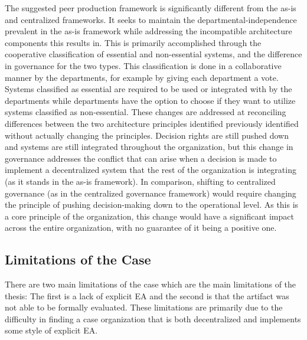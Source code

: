 The suggested peer production framework is significantly different from the as-is and centralized frameworks. It seeks to maintain the departmental-independence prevalent in the as-is framework while addressing the incompatible architecture components this results in. This is primarily accomplished through the cooperative classification of essential and non-essential systems, and the difference in governance for the two types. This classification is done in a collaborative manner by the departments, for example by giving each department a vote. Systems classified as essential are required to be used or integrated with by the departments while departments have the option to choose if they want to utilize systems classified as non-essential. These changes are addressed at reconciling differences between the two architecture principles identified previously identified without actually changing the principles. Decision rights are still pushed down and systems are still integrated throughout the organization, but this change in governance addresses the conflict that can arise when a decision is made to implement a decentralized system that the rest of the organization is integrating (as it stands in the as-is framework). In comparison, shifting to centralized governance (as in the centralized governance framework) would require changing the principle of pushing decision-making down to the operational level. As this is a core principle of the organization, this change would have a significant impact across the entire organization, with no guarantee of it being a positive one. 

%
%
%
%
%
%

\subsection{Limitations of the Case}

There are two main limitations of the case which are the main limitations of the thesis: The first is a lack of explicit EA and the second is that the artifact was not able to be formally evaluated. These limitations are primarily due to the difficulty in finding a case organization that is both decentralized and implements some style of explicit EA. 

